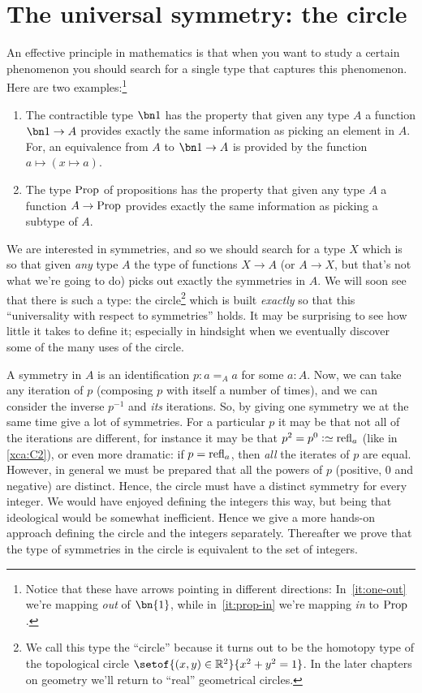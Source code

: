 \chapter{The universal symmetry: the circle}
\label{cha:circle}

An effective principle in mathematics is that when you want to study a certain 
phenomenon you should search for a single type that captures this phenomenon.  
Here are two examples:\footnote{%
  Notice that these have arrows pointing in different directions:
  In~\cref{it:one-out} we're mapping \emph{out} of $\bn{1}$,
  while in~\cref{it:prop-in} we're mapping \emph{in} to $\mathrm{Prop}$.}
\begin{enumerate}
\item\label{it:one-out}
  The contractible type $\bn 1$ has the property that given 
any type $A$ a function $\bn 1\to A$ provides exactly the 
same information as picking an element in $A$.
For, an equivalence from $A$ to $\bn 1\to A$ is provided by
the function $a \mapsto (x \mapsto a)$.
\item\label{it:prop-in}
  The type $\mathrm{Prop}$ of propositions has the property that 
given any type $A$ a function $A\to\mathrm{Prop}$ provides exactly 
the same information as picking a subtype of $A$.
\end{enumerate}
We are interested in symmetries, and so we should search for a type $X$ 
which is so that given \emph{any} type $A$ the type of functions 
$X\to A$ (or $A\to X$, but that's not what we're going to do) 
picks out exactly the symmetries in $A$.  
We will soon see that there is such a type: 
the circle\footnote{%
  We call this type the ``circle''
  because it turns out to be the homotopy type of
  the topological circle $\setof{(x,y)\in\RR^2}{x^2+y^2=1}$.
  In the later chapters on geometry we'll return
  to ``real'' geometrical circles.}
which is built \emph{exactly} so that this 
``universality with respect to symmetries'' holds.  
It may be surprising to see how little it takes to define it; 
especially in hindsight when we eventually discover some of the many uses of the circle.

A symmetry in $A$ is an identification $p:a=_Aa$ for some $a:A$.  
Now, we can take any iteration of $p$ (composing $p$ with itself a number of times), 
and we can consider the inverse $p^{-1}$ and \emph{its} iterations.  
So, by giving one symmetry we at the same time give a lot of symmetries.  
For a particular $p$ it may be that not all of the iterations are different, 
for instance it may be that $p^2=p^0\defequi\refl a$ (like in \cref{xca:C2}), 
or even more dramatic: if  $p=\mathrm{refl}_{a}$, then \emph{all} the iterates of $p$ are equal. 
However, in general we must be prepared that all the powers of $p$ 
(positive, $0$ and negative) are distinct. 
Hence, the circle must have a distinct symmetry for every integer. 
We would have enjoyed defining the integers this way, 
but being that ideological would be somewhat inefficient. 
Hence we give a more hands-on approach defining the circle 
and the integers separately. Thereafter we prove that the type of 
symmetries in the circle is equivalent to the set of integers. 

